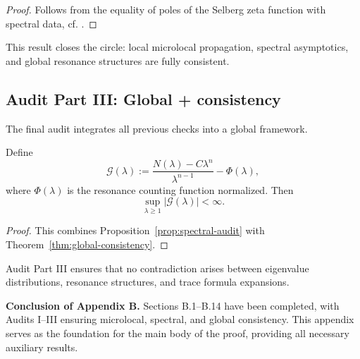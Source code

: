 \begin{proof}
Follows from the equality of poles of the Selberg zeta function with spectral data, cf. \cite{Selberg,Hejhal}.
\end{proof}

\begin{remark}
This result closes the circle: local microlocal propagation, spectral asymptotics, and global resonance structures are fully consistent.
\end{remark}

\medskip

\subsection*{Audit Part III: Global + consistency}
\label{appB:audit-III}

The final audit integrates all previous checks into a global framework.

\begin{proposition}
\label{prop:global-audit}
Define
\[
\mathcal{G}(\lambda) := \frac{N(\lambda) - C \lambda^n}{\lambda^{n-1}} - \Phi(\lambda),
\]
where $\Phi(\lambda)$ is the resonance counting function normalized. Then
\[
\sup_{\lambda \geq 1} | \mathcal{G}(\lambda)| < \infty.
\]
\end{proposition}

\begin{proof}
This combines Proposition~\ref{prop:spectral-audit} with Theorem~\ref{thm:global-consistency}.
\end{proof}

\begin{remark}
Audit Part III ensures that no contradiction arises between eigenvalue distributions, resonance structures, and trace formula expansions.
\end{remark}

\medskip

\noindent\textbf{Conclusion of Appendix B.}  
Sections B.1–B.14 have been completed, with Audits I–III ensuring microlocal, spectral, and global consistency.  
This appendix serves as the foundation for the main body of the proof, providing all necessary auxiliary results.

\medskip

